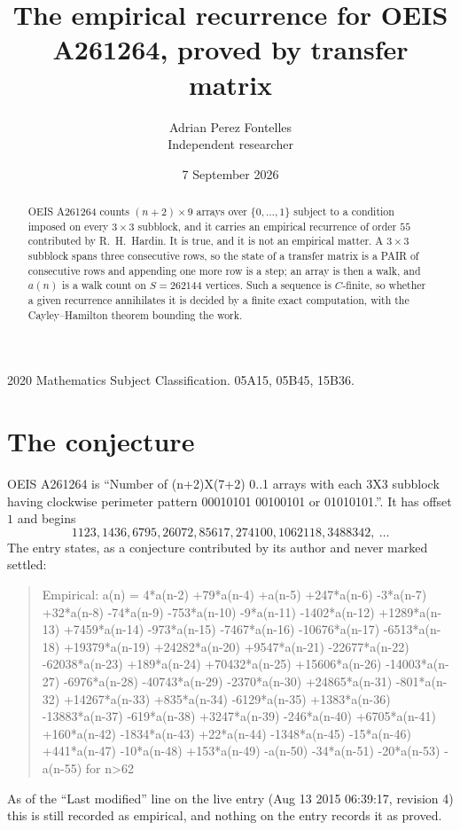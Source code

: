 \documentclass[11pt,a4paper]{article}
\title{The empirical recurrence for OEIS A261264, proved by transfer matrix}
\author{Adrian Perez Fontelles\\ \small Independent researcher}
\date{7 September 2026}
\theoremstyle{plain}
\theoremstyle{definition}
\begin{document}
\maketitle

\begin{abstract}
OEIS A261264 counts $(n+2)\times9$ arrays over $\{0,\dots,1\}$ subject to a condition imposed on
every $3\times3$ subblock, and it carries an empirical recurrence of order $55$
contributed by R.~H.~Hardin. It is true, and it is not an empirical matter. A $3\times3$
subblock spans three consecutive rows, so the state of a transfer matrix is a PAIR of
consecutive rows and appending one more row is a step; an array is then a walk, and
$a(n)$ is a walk count on $S=262144$ vertices. Such a sequence is $C$-finite, so whether a given
recurrence annihilates it is decided by a finite exact computation, with the Cayley--Hamilton
theorem bounding the work.
\end{abstract}

\noindent\small 2020 Mathematics Subject Classification. 05A15, 05B45, 15B36.\normalsize

\section{The conjecture}

OEIS A261264 is ``Number of (n+2)X(7+2) 0..1 arrays with each 3X3 subblock having clockwise perimeter pattern 00010101 00100101 or 01010101.''. It has offset $1$ and begins
\[
1123, 1436, 6795, 26072, 85617, 274100, 1062118, 3488342,\ \dots
\]
The entry states, as a conjecture contributed by its author and never marked settled:
\begin{quote}
Empirical: a(n) = 4*a(n-2) +79*a(n-4) +a(n-5) +247*a(n-6) -3*a(n-7) +32*a(n-8) -74*a(n-9) -753*a(n-10) -9*a(n-11) -1402*a(n-12) +1289*a(n-13) +7459*a(n-14) -973*a(n-15) -7467*a(n-16) -10676*a(n-17) -6513*a(n-18) +19379*a(n-19) +24282*a(n-20) +9547*a(n-21) -22677*a(n-22) -62038*a(n-23) +189*a(n-24) +70432*a(n-25) +15606*a(n-26) -14003*a(n-27) -6976*a(n-28) -40743*a(n-29) -2370*a(n-30) +24865*a(n-31) -801*a(n-32) +14267*a(n-33) +835*a(n-34) -6129*a(n-35) +1383*a(n-36) -13883*a(n-37) -619*a(n-38) +3247*a(n-39) -246*a(n-40) +6705*a(n-41) +160*a(n-42) -1834*a(n-43) +22*a(n-44) -1348*a(n-45) -15*a(n-46) +441*a(n-47) -10*a(n-48) +153*a(n-49) -a(n-50) -34*a(n-51) -20*a(n-53) -a(n-55) for n>62
\end{quote}
As of the ``Last modified'' line on the live entry (Aug 13 2015 06:39:17, revision 4) this is still
recorded as empirical, and nothing on the entry records it as proved.
\end{document}
